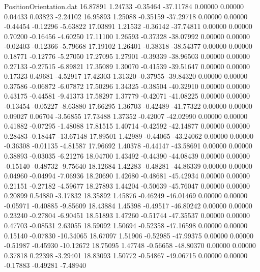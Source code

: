\begin{filecontents}{PositionOrientation.dat}
  16.87891    1.24733   -0.35464   -37.11784    0.00000    0.00000    0.04433    0.03823   -2.24102
  16.95893    1.25088   -0.35159   -37.29718    0.00000    0.00000   -0.44454   -0.12296   -5.63822
  17.03891    1.21532   -0.36142   -37.74811    0.00000    0.00000    0.70200   -0.16456   -4.60250
  17.11100    1.26593   -0.37328   -38.07992    0.00000    0.00000   -0.02403   -0.12366   -5.79668
  17.19102    1.26401   -0.38318   -38.54377    0.00000    0.00000    0.18771   -0.12776   -5.27050
  17.27095    1.27901   -0.39339   -38.96503    0.00000    0.00000    0.27133   -0.27515   -6.89821
  17.35089    1.30070   -0.41539   -39.51647    0.00000    0.00000    0.17323    0.49681   -4.52917
  17.42303    1.31320   -0.37955   -39.84320    0.00000    0.00000    0.37586   -0.06872   -6.07872
  17.50296    1.34325   -0.38504   -40.32910    0.00000    0.00000    0.43175   -0.44581   -9.41373
  17.58297    1.37779   -0.42071   -41.08225    0.00000    0.00000   -0.13454   -0.05227   -8.63880
  17.66295    1.36703   -0.42489   -41.77322    0.00000    0.00000    0.09027    0.06704   -3.56855
  17.73488    1.37352   -0.42007   -42.02990    0.00000    0.00000    0.41882   -0.07295   -1.48088
  17.81515    1.40714   -0.42592   -42.14877    0.00000    0.00000    0.28483   -0.18447  -13.67148
  17.89501    1.42989   -0.44065   -43.24062    0.00000    0.00000   -0.36308   -0.01135   -4.81587
  17.96692    1.40378   -0.44147   -43.58691    0.00000    0.00000    0.38893   -0.03035   -6.21276
  18.04700    1.43492   -0.44390   -44.08439    0.00000    0.00000   -0.15140   -0.48732   -9.75640
  18.12684    1.42283   -0.48281   -44.86339    0.00000    0.00000    0.04960   -0.04994   -7.06936
  18.20690    1.42680   -0.48681   -45.42934    0.00000    0.00000    0.21151   -0.27182   -4.59677
  18.27893    1.44204   -0.50639   -45.76047    0.00000    0.00000    0.20899    0.54880   -3.17832
  18.35892    1.45876   -0.46249   -46.01469    0.00000    0.00000   -0.05971   -0.40885   -9.85609
  18.43884    1.45398   -0.49517   -46.80242    0.00000    0.00000    0.23240   -0.27804   -6.90451
  18.51893    1.47260   -0.51744   -47.35537    0.00000    0.00000    0.47703   -0.08531    2.63055
  18.59092    1.50694   -0.52358   -47.16598    0.00000    0.00000    0.15140   -0.07830  -10.34065
  18.67097    1.51906   -0.52985   -47.99375    0.00000    0.00000   -0.51987   -0.45930  -10.12672
  18.75095    1.47748   -0.56658   -48.80370    0.00000    0.00000    0.37818    0.22398   -3.29401
  18.83093    1.50772   -0.54867   -49.06715    0.00000    0.00000   -0.17883   -0.49281   -7.48940

\end{filecontents}
